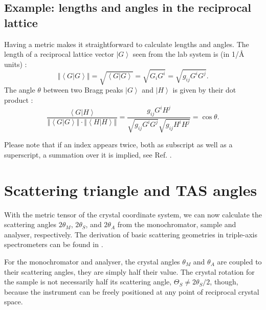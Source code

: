 \subsection*{Example: lengths and angles in the reciprocal lattice}
Having a metric makes it straightforward to calculate lengths and angles.
The length of a reciprocal lattice vector $\left| G \right>$ seen from the lab system is (in 1/\AA{} units) \cite[p. 808]{Arens2015}:
\begin{equation}
	\left\Vert \left< G | G \right> \right\Vert = \sqrt{\left< G | G \right>} = \sqrt{G_i G^i} = \sqrt{g_{ij} G^i G^j}.
\end{equation}
The angle $\theta$ between two Bragg peaks $\left| G \right>$ and $\left| H \right>$ is given by their dot product \cite[p. 808]{Arens2015}:
\begin{equation}
	\frac{\left< G | H \right>}{\left\Vert \left< G | G \right> \right\Vert \cdot \left\Vert \left< H | H \right> \right\Vert} = 
	\frac{g_{ij} G^i H^j }{\sqrt{g_{ij} G^i G^j} \sqrt{g_{ij} H^i H^j}} = \cos \theta.
\end{equation}

Please note that if an index appears twice, both as subscript as well as a superscript, a summation over it is implied, see Ref. \cite{wiki_summation}.




\section{Scattering triangle and TAS angles \label{sec:tasangles}}

With the metric tensor of the crystal coordinate system, we can now calculate the scattering angles $2 \theta_M$, $2 \theta_S$, and $2 \theta_A$ from the monochromator, sample and analyser, respectively. The derivation of basic scattering geometries in triple-axis spectrometers can be found in \cite[Ch. 1.3]{Shirane2002}.

For the monochromator and analyser, the crystal angles $\theta_M$ and $\theta_A$ are coupled to their scattering angles, they are simply half their value. 
The crystal rotation for the sample is not necessarily half its scattering angle, $\Theta_S \ne 2\theta_S/2$, though, because the instrument can be freely positioned at any point of reciprocal crystal space.

